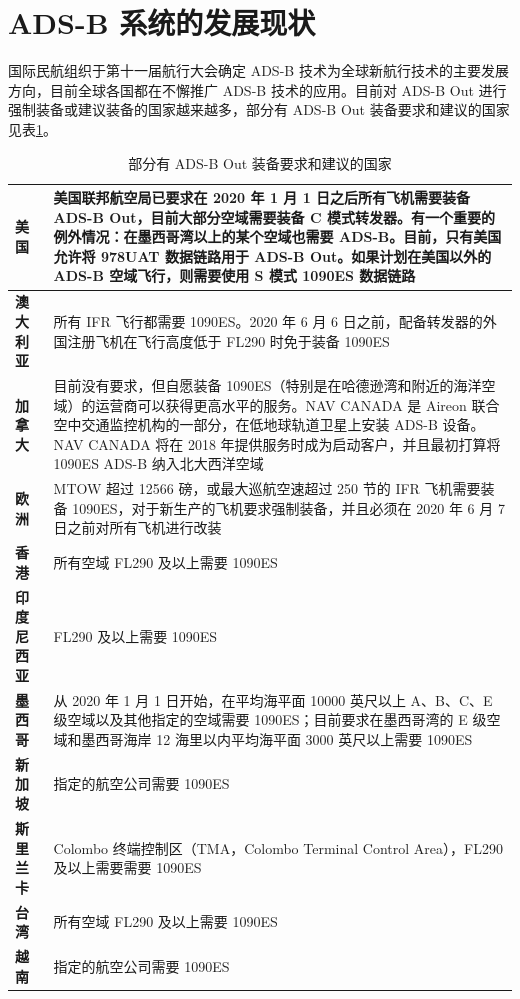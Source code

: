 \section{ADS-B 系统的发展现状}

国际民航组织于第十一届航行大会确定 ADS-B 技术为全球新航行技术的主要发展方向，目前全球各国都在不懈推广 ADS-B 技术的应用。目前对 ADS-B Out 进行强制装备或建议装备的国家越来越多，部分有 ADS-B Out 装备要求和建议的国家见表\ref{tab:Countries_with_ADS-B_Out_mandates_and_proposals}。

\renewcommand\arraystretch{1.5}
\begin{table}[htbp]
\centering
\caption{部分有 ADS-B Out 装备要求和建议的国家\protect\footnotemark}
\label{tab:Countries_with_ADS-B_Out_mandates_and_proposals}
\begin{tabular}[b]{|p{2cm}<{\raggedleft}|p{13cm}<{\raggedright}|}
\hline
\textbf{美国} & 美国联邦航空局已要求在 2020 年 1 月 1 日之后所有飞机需要装备 ADS-B Out，目前大部分空域需要装备 C 模式转发器。有一个重要的例外情况：在墨西哥湾以上的某个空域也需要 ADS-B。目前，只有美国允许将 978UAT 数据链路用于 ADS-B Out。如果计划在美国以外的 ADS-B 空域飞行，则需要使用 S 模式 1090ES 数据链路 \\
\hline
\textbf{澳大利亚} & 所有 IFR 飞行都需要 1090ES。2020 年 6 月 6 日之前，配备转发器的外国注册飞机在飞行高度低于 FL290 时免于装备 1090ES \\
\hline
\textbf{加拿大} & 目前没有要求，但自愿装备 1090ES（特别是在哈德逊湾和附近的海洋空域）的运营商可以获得更高水平的服务。NAV CANADA 是 Aireon 联合空中交通监控机构的一部分，在低地球轨道卫星上安装 ADS-B 设备。NAV CANADA 将在 2018 年提供服务时成为启动客户，并且最初打算将 1090ES ADS-B 纳入北大西洋空域 \\
\hline
\textbf{欧洲} & MTOW 超过 12566 磅，或最大巡航空速超过 250 节的 IFR 飞机需要装备 1090ES，对于新生产的飞机要求强制装备，并且必须在 2020 年 6 月 7 日之前对所有飞机进行改装 \\
\hline
\textbf{香港} & 所有空域 FL290 及以上需要 1090ES \\
\hline
\textbf{印度尼西亚} & FL290 及以上需要 1090ES \\
\hline
\textbf{墨西哥} & 从 2020 年 1 月 1 日开始，在平均海平面 10000 英尺以上 A、B、C、E 级空域以及其他指定的空域需要 1090ES；目前要求在墨西哥湾的 E 级空域和墨西哥海岸 12 海里以内平均海平面 3000 英尺以上需要 1090ES \\
\hline
\textbf{新加坡} & 指定的航空公司需要 1090ES \\
\hline
\textbf{斯里兰卡} & Colombo 终端控制区（TMA，Colombo Terminal Control Area），FL290 及以上需要需要 1090ES \\
\hline
\textbf{台湾} & 所有空域 FL290 及以上需要 1090ES \\
\hline
\textbf{越南} & 指定的航空公司需要 1090ES \\
\hline
\end{tabular}
\end{table}

